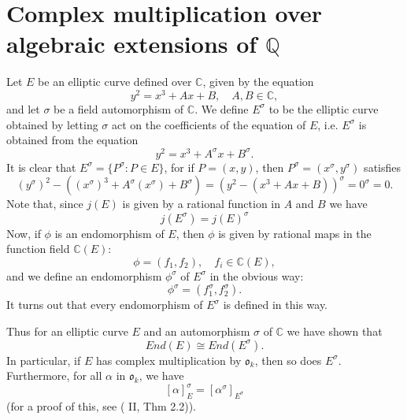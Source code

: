 \newpage
\section{Complex multiplication over algebraic extensions of $\mathbb{Q}$}
\label{sec:compl-mult-over-Q}

Let $E$ be an elliptic curve defined over $\mathbb{C}$, given by the equation
\begin{equation*}
  y^{2} = x^{3} + Ax + B, \quad A, B \in \mathbb{C},
\end{equation*}
and let $\sigma$ be a field automorphism of $\mathbb{C}$. We define $E^{\sigma}$ to
be the elliptic curve obtained by letting $\sigma$ act on the coefficients of the
equation of $E$, i.e. $E^{\sigma}$ is obtained from the equation
\begin{equation*}
  y^{2} = x^{3} + A^{\sigma}x + B^{\sigma}.
\end{equation*}
It is clear that $E^{\sigma} = \{ P^{\sigma} : P \in E \}$, for if $P = (x,y)$, then
$P^{\sigma} = (x^{\sigma},y^{\sigma})$ satisfies
\begin{equation*}
  (y^{\sigma})^{2} - ( (x^{\sigma})^{3} + A^{\sigma}(x^{\sigma}) + B^{\sigma} ) = (y^{2} -
  (x^{3} + Ax + B))^{\sigma} = 0^{\sigma} = 0.
\end{equation*}
Note that, since $j(E)$ is given by a rational function in $A$ and $B$ we have
\begin{equation}
  \label{eq:j(E-sigma)-equals-j(E)-sigma}
  j(E^{\sigma}) = j(E)^{\sigma}
\end{equation}
Now, if $\phi$ is an endomorphism of $E$, then $\phi$ is given by rational maps in
the function field $\mathbb{C}(E)$:
\begin{equation*}
  \phi = (f_{1},f_{2}), \quad f_{i} \in \mathbb{C}(E),
\end{equation*}
and we define an endomorphism $\phi^{\sigma}$ of $E^{\sigma}$ in the obvious way:
\begin{equation*}
  \phi^{\sigma} = (f_{1}^{\sigma},f_{2}^{\sigma}).
\end{equation*}
It turns out that every endomorphism of $E^{\sigma}$ is defined in this way.

Thus for an elliptic curve $E$ and an automorphism $\sigma$ of $\mathbb{C}$ we have
shown that
\begin{equation}
  \label{eq:End(E)-equals-End(E-sigma)}
  End(E) \cong End(E^{\sigma}).
\end{equation}
In particular, if $E$ has complex multiplication by $\mathfrak{o}_{k}$, then so does
$E^{\sigma}$.  Furthermore, for all $\alpha$ in $\mathfrak{o}_{k}$, we have
\begin{equation}
  \label{eq:galois-on-o_k}
  [\alpha]_{E}^{\sigma} = [\alpha^{\sigma}]_{E^{\sigma}}
\end{equation}
(for a proof of this, see (\cite{silverman94} II, Thm 2.2)).

